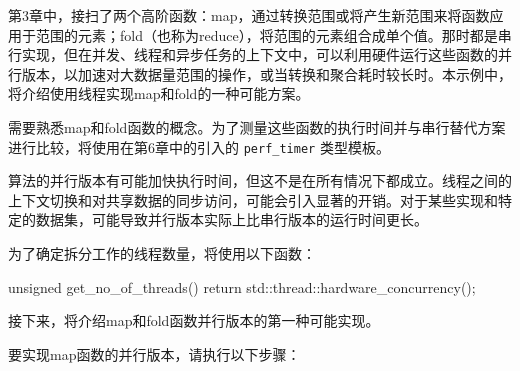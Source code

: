 第3章中，接扫了两个高阶函数：map，通过转换范围或将产生新范围来将函数应用于范围的元素；fold（也称为reduce），将范围的元素组合成单个值。那时都是串行实现，但在并发、线程和异步任务的上下文中，可以利用硬件运行这些函数的并行版本，以加速对大数据量范围的操作，或当转换和聚合耗时较长时。本示例中，将介绍使用线程实现map和fold的一种可能方案。


需要熟悉map和fold函数的概念。为了测量这些函数的执行时间并与串行替代方案进行比较，将使用在第6章中的引入的 \verb|perf_timer| 类型模板。

\begin{myNotic}
算法的并行版本有可能加快执行时间，但这不是在所有情况下都成立。线程之间的上下文切换和对共享数据的同步访问，可能会引入显著的开销。对于某些实现和特定的数据集，可能导致并行版本实际上比串行版本的运行时间更长。
\end{myNotic}

为了确定拆分工作的线程数量，将使用以下函数：

\begin{cpp}
unsigned get_no_of_threads()
{
    return std::thread::hardware_concurrency();
}
\end{cpp}

接下来，将介绍map和fold函数并行版本的第一种可能实现。


要实现map函数的并行版本，请执行以下步骤：


